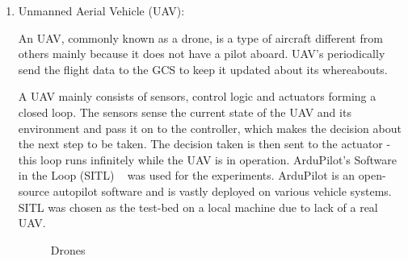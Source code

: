 \begin{enumerate}
\item Unmanned Aerial Vehicle (UAV): 


An UAV, commonly known as a drone, is a type of aircraft different from others mainly because it does not have a pilot aboard. UAV's periodically send the flight data to the GCS to keep it updated about its whereabouts.
 
A UAV mainly consists of sensors, control logic and actuators forming a closed loop. The sensors sense the current state of the UAV and its environment and pass it on to the controller, which makes the decision about the next step to be taken. The decision taken is then sent to the actuator - this loop runs infinitely while the UAV is in operation. ArduPilot's Software in the Loop (SITL) ~\cite{ArdupilotSITL} was used for the experiments. ArduPilot is an open-source autopilot software and is vastly deployed on various vehicle systems. SITL was chosen as the test-bed on a local machine due to lack of a real UAV.  


\begin{figure}%
    \centering
    \qquad
    \caption{Drones}%
    \label{fig:drone}%
\end{figure}



\end{enumerate}

